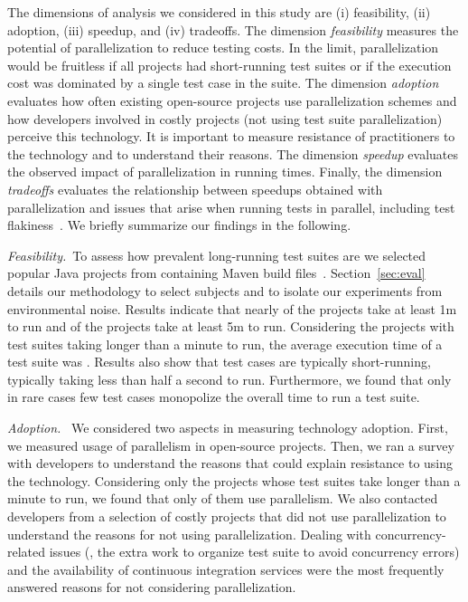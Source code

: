 The dimensions of analysis we considered in this study are (i)
feasibility, (ii) adoption, (iii) speedup, and (iv) tradeoffs.  The
dimension \emph{feasibility} measures the potential of parallelization
to reduce testing costs.  In the limit, parallelization would be
fruitless if all projects had short-running test suites or if the
execution cost was dominated by a single test case in the suite.  The
dimension \emph{adoption} evaluates how often existing open-source
projects use parallelization schemes and how developers involved in
costly projects (not using test suite parallelization) perceive this
technology.  It is important to measure resistance of practitioners to
the technology and to understand their reasons.  The dimension
\emph{speedup} evaluates the observed impact of
parallelization in running times.  Finally, the dimension
\emph{tradeoffs} evaluates the relationship between speedups obtained
with parallelization and issues that arise 
when running tests in parallel, including test
flakiness~\cite{luo-etal-fse2014,bell-etal-esecfse2015}.  We briefly summarize our findings
in the following.


\noindent\emph{Feasibility.}~To assess how prevalent long-running test suites
are we selected \numSubjs{} popular Java projects from \github{} containing
Maven build files~\cite{maven}.  Section~\ref{sec:eval} details our methodology
to select subjects and to isolate our experiments from environmental noise.
Results indicate that nearly \percentMedLongRunning{} of the projects take at
least 1m to run and \percentLongRunning{} of the projects take at least 5m to
run.  Considering the \numMedLong{} projects with test suites taking longer than
a minute to run, the average execution time of a test suite was
\averageMedLongRunning{}.  Results also show that test cases are typically
short-running, typically taking less than half a second to run.  Furthermore, we
found that only in rare cases few test cases monopolize the overall time to run
a test suite.


\noindent\emph{Adoption.}~ We considered two aspects in measuring technology
adoption.  First, we measured usage of parallelism in open-source projects.
Then, we ran a survey with developers to understand the reasons that could
explain resistance to using the technology.
Considering only the projects whose test suites take longer than a minute to
run, we found that only \percentParallelUpdated{} of them use parallelism.  We
also contacted developers from a selection of costly projects that did not use
parallelization to understand the reasons for not using parallelization.
Dealing with concurrency-related issues (\eg{}, the extra work to organize test
suite to avoid concurrency errors) and the availability of continuous
integration services were the most frequently answered reasons for not
considering parallelization.

